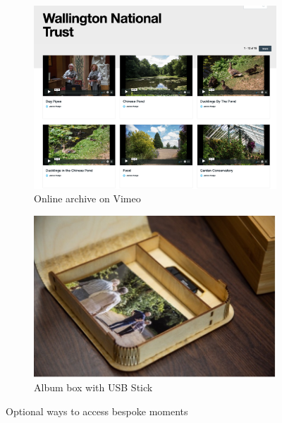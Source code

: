 \begin{figure}
\centering
\begin{subfigure}{.5\textwidth}
  \centering
  \includegraphics[width=.8\linewidth]{Images/VimeoWebsite.png}
  \caption{Online archive on Vimeo}
  \label{fig:onlineArchive}
\end{subfigure}%
\begin{subfigure}{.5\textwidth}
  \centering
  \includegraphics[width=.8\linewidth]{Images/InsidePhotoAlbum.jpg}
  \caption{Album box with USB Stick}
  \label{fig:AlbumBox}
\end{subfigure}
\caption{Optional ways to access bespoke moments}
\label{fig:OptionalMoments}
\end{figure}


